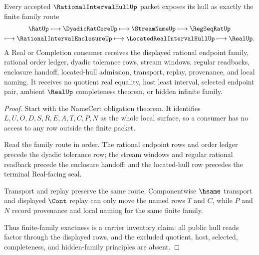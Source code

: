 \begin{theorem}
\label{thm:rational-interval-hull-finite-family-exactness}
Every accepted $\RationalIntervalHullUp$ packet exposes its hull as exactly the finite family route
$$
\begin{gathered}
\RatUp \longmapsto \DyadicRatCoreUp \longmapsto \StreamNameUp \longmapsto \RegSeqRatUp \\
\longmapsto \RationalIntervalEnclosureUp \longmapsto \LocatedRealIntervalHullUp \longmapsto \RealUp .
\end{gathered}
$$
A Real or Completion consumer receives the displayed rational endpoint family, rational order ledger, dyadic tolerance rows, stream windows, regular readbacks, enclosure handoff, located-hull admission, transport, replay, provenance, and local naming. It receives no quotient real equality, host least interval, selected endpoint pair, ambient $\RealUp$ completeness theorem, or hidden infinite family.
\end{theorem}
\begin{proof}
Start with the NameCert obligation theorem. It identifies $L,U,O,D,S,R,E,A,T,C,P,N$ as the whole local surface, so a consumer has no access to any row outside the finite packet.

Read the family route in order. The rational endpoint rows and order ledger precede the dyadic tolerance row; the stream windows and regular rational readback precede the enclosure handoff; and the located-hull row precedes the terminal Real-facing seal.

Transport and replay preserve the same route. Componentwise $\hsame$ transport and displayed $\Cont$ replay can only move the named rows $T$ and $C$, while $P$ and $N$ record provenance and local naming for the same finite family.

Thus finite-family exactness is a carrier inventory claim: all public hull reads factor through the displayed rows, and the excluded quotient, host, selected, completeness, and hidden-family principles are absent.
\end{proof}


